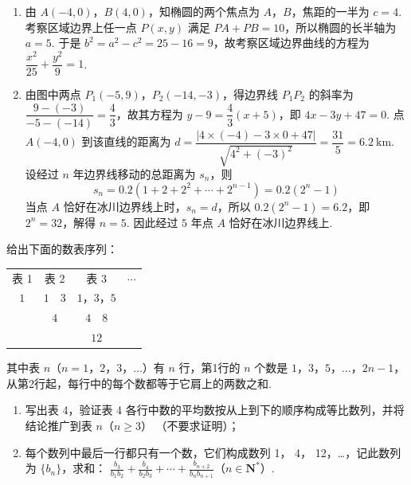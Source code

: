 \begin{solution}
\begin{enumerate}
\item 由 \(A(-4,0)\)，\(B(4,0)\)，知椭圆的两个焦点为 \(A\)，\(B\)，焦距的一半为 \(c=4\). 考察区域边界上任一点 \(P(x,y)\) 满足 \(PA+PB=10\)，所以椭圆的长半轴为 \(a=5\). 于是 \(b^2=a^2-c^2=25-16=9\)，故考察区域边界曲线的方程为 \(\dfrac{x^2}{25}+\dfrac{y^2}{9}=1\).
\item 由图中两点 \(P_1(-5,9)\)，\(P_2(-14,-3)\)，得边界线 \(P_1P_2\) 的斜率为 \(\dfrac{9-(-3)}{-5-(-14)}=\dfrac{4}{3}\)，故其方程为 \(y-9=\dfrac{4}{3}(x+5)\)，即 \(4x-3y+47=0\). 点 \(A(-4,0)\) 到该直线的距离为 \(d=\dfrac{|4\times(-4)-3\times0+47|}{\sqrt{4^2+(-3)^2}}=\dfrac{31}{5}=6.2\ \mathrm{km}\). 设经过 \(n\) 年边界线移动的总距离为 \(s_n\)，则
\[
s_n=0.2(1+2+2^2+\cdots+2^{n-1})=0.2(2^n-1)
\]
当点 \(A\) 恰好在冰川边界线上时，\(s_n=d\)，所以 \(0.2(2^n-1)=6.2\)，即 \(2^n=32\)，解得 \(n=5\). 因此经过 \(5\) 年点 \(A\) 恰好在冰川边界线上.
\end{enumerate}
\end{solution}

\begin{problem}
给出下面的数表序列：

\begin{center}
\begin{tabular}{cccc}
表 1 & 表 2 & 表 3 & \(\cdots\) \\
\(1\) & \(1\quad 3\) & \(1\)，\(3\)，\(5\) & \\
& \(4\) & \(4\quad 8\) & \\
& & \(12\) &
\end{tabular}
\end{center}

其中表 \(n\)（\(n = 1\)，\(2\)，\(3\)，\(\dots\)）有 \(n\) 行，第1行的 \(n\) 个数是 \(1\)，\(3\)，\(5\)，\(\dots\)，\(2n - 1\)，从第2行起，每行中的每个数都等于它肩上的两数之和.
\begin{enumerate}
\item 写出表 4，验证表 4 各行中数的平均数按从上到下的顺序构成等比数列，并将结论推广到表 \(n\)（\(n \geqslant 3\)） （不要求证明）；
\item 每个数列中最后一行都只有一个数，它们构成数列 1， 4， 12，…，记此数列为 \(\{b_n\}\)，求和： \(\frac{b_3}{b_1b_2} + \frac{b_4}{b_2b_3} + \cdots + \frac{b_{n+2}}{b_nb_{n+1}}\)（\(n \in \mathbf{N}^*\)）.
\end{enumerate}
\end{problem}

